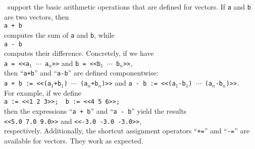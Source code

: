 \setlx\ support the basic arithmetic operations that are defined for vectors.  If \texttt{a} and
\texttt{b} are two vectors, then 
\\[0.2cm]
\hspace*{1.3cm}
\texttt{a + b}
\\[0.2cm]
computes the sum of \texttt{a} and \texttt{b}, while 
\\[0.2cm]
\hspace*{1.3cm}
\texttt{a - b}
\\[0.2cm]
computes their difference.  Concretely, if we have
\\[0.2cm]
\hspace*{1.3cm}
\texttt{a = <<a$_1$ $\cdots$ a$_n$>>} \quad and \quad
\texttt{b = <<b$_1$ $\cdots$ b$_n$>>},
\\[0.2cm]
then ``\texttt{a+b}'' and ``\texttt{a-b}'' are defined componentwise:
\\[0.2cm]
\hspace*{1.3cm}
\texttt{a + b := <<(a$_1$+b$_1$) $\cdots$ (a$_n$+b$_n$)>>} \quad and \quad
\texttt{a - b := <<(a$_1$-b$_1$) $\cdots$ (a$_n$-b$_n$)>>}.
\\[0.2cm]
For example, if we define
\\[0.2cm]
\hspace*{1.3cm}
\texttt{a := <<1 2 3>>; \ b := <<4 5 6>>;}
\\[0.2cm]
then the expressions ``\texttt{a + b}'' and ``\texttt{a - b}'' yield the results
\\[0.2cm]
\hspace*{1.3cm}
\texttt{<<5.0 7.0 9.0>>} \quad and \quad \texttt{<<-3.0 -3.0 -3.0>>},
\\[0.2cm]
respectively.  Additionally, the shortcut assignment operators ``\texttt{+=}'' and ``\texttt{-=}''
are available for vectors.  They work as expected.

